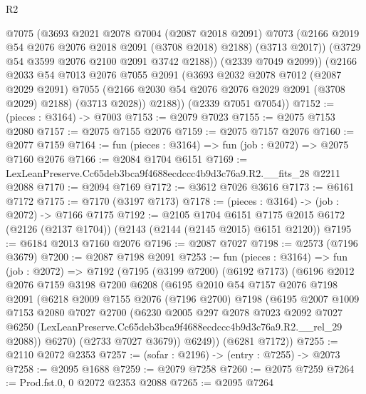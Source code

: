 \begin{lexlean}{R2}
\begin{coremodule}
            @7075
            (@3693
              @2021
              @2078
              @7004
              (@2087 @2018 @2091)
              @7073
              (@2166 @2019 @54 @2076 @2076 @2018 @2091 (@3708 @2018) @2188)
              (@3713 @2017))
            (@3729 @54 @3599 @2076 @2100 @2091 @3742 @2188))
          (@2339 @7049 @2099))
        (@2166
          @2033
          @54
          @7013
          @2076
          @7055
          @2091
          (@3693
            @2032
            @2078
            @7012
            (@2087 @2029 @2091)
            @7055
            (@2166 @2030 @54 @2076 @2076 @2029 @2091 (@3708 @2029) @2188)
            (@3713 @2028))
          @2188))
      (@2339 @7051 @7054))
@7152 := (pieces : @3164) -> @7003
@7153 := @2079 @7023
@7155 := @2075 @7153 @2080
@7157 := @2075 @7155 @2076
@7159 := @2075 @7157 @2076
@7160 := @2077 @7159
@7164 := fun (pieces : @3164) => fun (job : @2072) => @2075 @7160 @2076
@7166 := @2084 @1704 @6151
@7169 := LexLeanPreserve.Cc65deb3bca9f4688ecdccc4b9d3c76a9.R2.__fits_28 @2211 @2088
@7170 := @2094 @7169
@7172 := @3612 @7026 @3616
@7173 := @6161 @7172
@7175 := @7170 (@3197 @7173)
@7178 := (pieces : @3164) -> (job : @2072) -> @7166 @7175
@7192 := @2105
    @1704
    @6151
    @7175
    @2015
    @6172
    (@2126 (@2137 @1704))
    (@2143 (@2144 (@2145 @2015) @6151 @2120))
@7195 := @6184 @2013 @7160 @2076
@7196 := @2087 @7027
@7198 := @2573 (@7196 @3679)
@7200 := @2087 @7198 @2091
@7253 := fun (pieces : @3164) =>
  fun (job : @2072) =>
  @7192
    (@7195
      (@3199 @7200)
      (@6192 @7173)
      (@6196
        @2012
        @2076
        @7159
        @3198
        @7200
        @6208
        (@6195
          @2010
          @54
          @7157
          @2076
          @7198
          @2091
          (@6218
            @2009
            @7155
            @2076
            (@7196 @2700)
            @7198
            (@6195
              @2007
              @1009
              @7153
              @2080
              @7027
              @2700
              (@6230
                @2005
                @297
                @2078
                @7023
                @2092
                @7027
                @6250
                (LexLeanPreserve.Cc65deb3bca9f4688ecdccc4b9d3c76a9.R2.__rel_29 @2088))
              @6270)
            (@2733 @7027 @3679))
          @6249))
      (@6281 @7172))
@7255 := @2110 @2072 @2353
@7257 := (sofar : @2196) -> (entry : @7255) -> @2073
@7258 := @2095 @1688
@7259 := @2079 @7258
@7260 := @2075 @7259
@7264 := Prod.fst.{0, 0} @2072 @2353 @2088
@7265 := @2095 @7264

\end{coremodule}
\end{lexlean}
